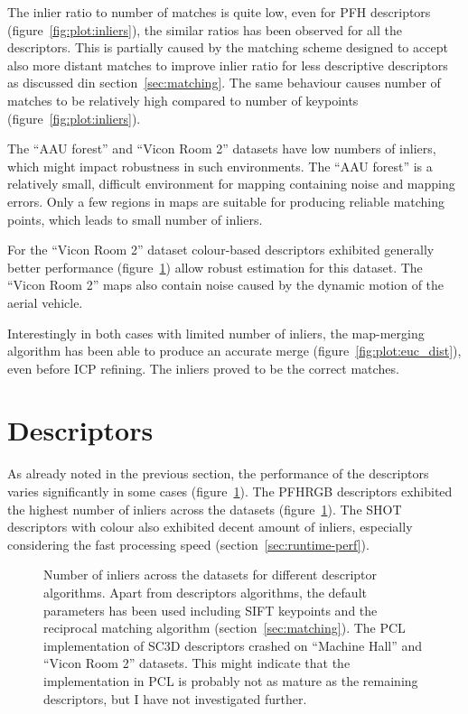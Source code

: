 The inlier ratio to number of matches is quite low, even for \gls{PFH} descriptors (figure~\ref{fig:plot:inliers}), the similar ratios has been observed for all the descriptors. This is partially caused by the matching scheme designed to accept also more distant matches to improve inlier ratio for less descriptive descriptors as discussed din section~\ref{sec:matching}. The same behaviour causes number of matches to be relatively high compared to number of keypoints (figure~\ref{fig:plot:inliers}).

The ``AAU forest'' and ``Vicon Room 2'' datasets have low numbers of inliers, which might impact robustness in such environments. The ``AAU forest'' is a relatively small, difficult environment for mapping containing noise and mapping errors. Only a few regions in maps are suitable for producing reliable matching points, which leads to small number of inliers.

For the ``Vicon Room 2'' dataset colour-based descriptors exhibited generally better performance (figure~\ref{fig:plot:desc_inliers}) allow robust estimation for this dataset. The ``Vicon Room 2'' maps also contain noise caused by the dynamic motion of the aerial vehicle.

Interestingly in both cases with limited number of inliers, the map-merging algorithm has been able to produce an accurate merge (figure~\ref{fig:plot:euc_dist}), even before \gls{ICP} refining. The inliers proved to be the correct matches.

\section{Descriptors}

As already noted in the previous section, the performance of the descriptors varies significantly in some cases (figure~\ref{fig:plot:desc_inliers}). The \gls{PFHRGB} descriptors exhibited the highest number of inliers across the datasets (figure~\ref{fig:plot:desc_inliers}). The \gls{SHOT} descriptors with colour also exhibited decent amount of inliers, especially considering the fast processing speed (section~\ref{sec:runtime-perf}).

\begin{figure}
  \centering
  
  \caption[Number of inliers per descriptors]{Number of inliers across the datasets for different descriptor algorithms. Apart from descriptors algorithms, the default parameters has been used including \gls{SIFT} keypoints and the reciprocal matching algorithm (section~\ref{sec:matching}). The \gls{PCL} implementation of \gls{SC3D} descriptors crashed on ``Machine Hall'' and ``Vicon Room 2'' datasets. This might indicate that the implementation in \gls{PCL} is probably not as mature as the remaining descriptors, but I have not investigated further.}
  \label{fig:plot:desc_inliers}
\end{figure}

